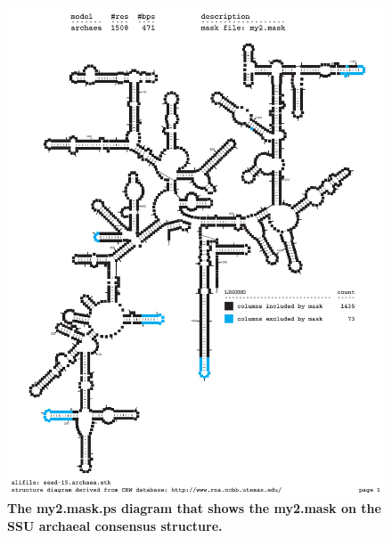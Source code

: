\begin{figure}
\begin{center}
\includegraphics[width=5.7in]{Figures/my2-mask}
\end{center}
\caption{\textbf{The my2.mask.ps diagram that shows the my2.mask on
    the SSU archaeal consensus structure.}}
\label{fig:mymask2}
\end{figure}















